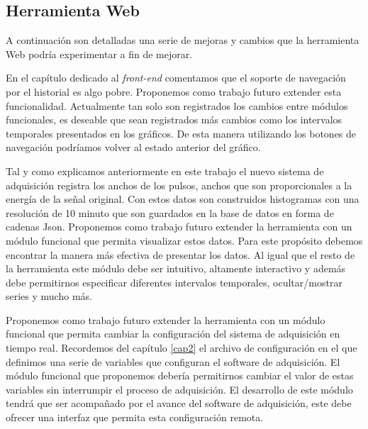 	\subsection{Herramienta Web}
		A continuación son detalladas una serie de mejoras y cambios que la herramienta Web podría experimentar a fin de mejorar.
		\begin{description}[style=unboxed,leftmargin=0cm,labelwidth=1cm]
			\item[Extender el soporte de navegación por el historial]
				En el capítulo dedicado al \emph{front-end} comentamos que el soporte de navegación por el historial es algo pobre.
				Proponemos como trabajo futuro extender esta funcionalidad. Actualmente tan solo son registrados los cambios entre
				módulos funcionales, es deseable que sean registrados más cambios como los intervalos temporales presentados en los
				gráficos. De esta manera utilizando los botones de navegación podríamos volver al estado anterior del gráfico.
			\item[Anchos de pulso] 
				Tal y como explicamos anteriormente en este trabajo el nuevo sistema de adquisición registra los anchos de los pulsos,
				anchos que son proporcionales a la energía de la señal original. Con estos datos son construidos histogramas con una
				resolución de 10 minuto que son guardados en la base de datos en forma de cadenas Json. Proponemos como trabajo futuro
				extender la herramienta con un módulo funcional que permita visualizar estos datos. Para este propósito debemos
				encontrar la manera más efectiva de presentar los datos. Al igual que el resto de la herramienta este módulo debe ser
				intuitivo, altamente interactivo y además debe permitirnos especificar diferentes intervalos temporales,
				ocultar/mostrar series y mucho más.
			\item[Configuración del sistema de adquisición]
				Proponemos como trabajo futuro extender la herramienta con un módulo funcional que permita cambiar la configuración
				del sistema de adquisición en tiempo real. Recordemos del capítulo \ref{cap2} el archivo de configuración en el que
				definimos una serie de variables que configuran el software de adquisición. El módulo funcional que proponemos debería
				permitirnos cambiar el valor de estas variables sin interrumpir el proceso de adquisición. El desarrollo de este
				módulo tendrá que ser acompañado por el avance del software de adquisición, este debe ofrecer una interfaz que permita
				esta configuración remota.
			\item[Alarmas y Notificación]

\end{description}
